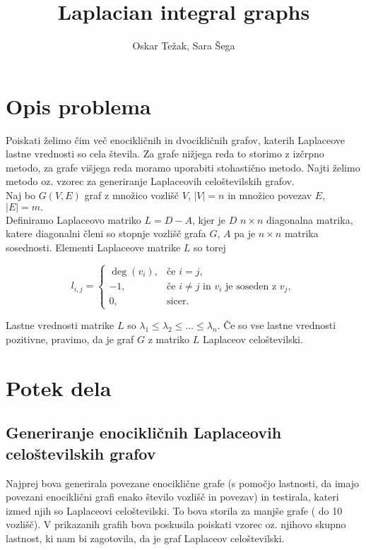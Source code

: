 \documentclass{article}
\begin{document}
\title{Laplacian integral graphs}
\author{Oskar Težak, Sara Šega}

\maketitle

\section{Opis problema}

Poiskati želimo čim več enocikličnih in dvocikličnih grafov, katerih Laplaceove lastne vrednosti so cela števila. 
Za grafe nižjega reda to storimo z izčrpno metodo, za grafe višjega reda moramo uporabiti stohastično metodo. 
Najti želimo metodo oz. vzorec za generiranje Laplaceovih celoštevilskih grafov. \\ 
Naj bo $G(V,E)$ graf z množico vozlišč $V$, $ \left| V \right| = n $
in množico povezav $E$, $\left| E \right| = m. $ \\
Definiramo Laplaceovo matriko $ L = D - A $, kjer je $D$ $ n \times n $ diagonalna matrika, katere diagonalni členi so stopnje vozlišč grafa $G$, 
$A$ pa je $ n \times n $ matrika sosednosti. Elementi Laplaceove matrike $L$ so torej

\[
l_{i,j} = 
\begin{cases} 
    \deg(v_i), & \text{če } i = j, \\
    -1, & \text{če } i \neq j \text{ in } v_i \text{ je soseden z } v_j, \\
    0, & \text{sicer}.
\end{cases}
\]

Lastne vrednosti matrike $L$ so $ \lambda_1 \leq \lambda_2 \leq \dots \leq \lambda_n .$ Če so vse lastne
vrednosti pozitivne, pravimo, da je graf $G$ z matriko $L$ Laplaceov celoštevilski. 


\section{Potek dela}

\subsection{Generiranje enocikličnih Laplaceovih celoštevilskih grafov}
Najprej bova generirala povezane enociklične grafe (s pomočjo lastnosti, da imajo povezani enociklični grafi enako število vozlišč in povezav) in testirala, kateri izmed 
njih so Laplaceovi celoštevilski. To bova storila za manjše grafe ( do 10 vozlišč). V prikazanih grafih bova poskusila poiskati vzorec oz. njihovo skupno lastnost,
ki nam bi zagotovila, da je graf Laplaceov celoštevilski. \\
\end{document}
